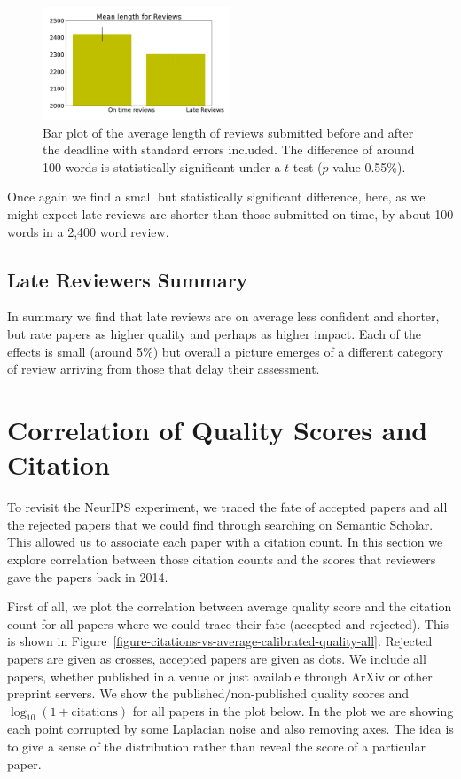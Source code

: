 \begin{figure}[htb]
\centering
\includegraphics[width=0.50\textwidth]{diagrams/neurips/review-length-early-late.pdf}

\caption{Bar plot of the average length of reviews
submitted before and after the deadline with standard errors included.
The difference of around 100 words is statistically significant under a
\(t\)-test (\(p\)-value 0.55\%).} \label{review-length-early-late}
\end{figure}

Once again we find a small but statistically significant difference,
here, as we might expect late reviews are shorter than those submitted
on time, by about 100 words in a 2,400 word review.


\subsection{Late Reviewers Summary}\label{late-reviewers-summary}

In summary we find that late reviews are on average less confident and
shorter, but rate papers as higher quality and perhaps as higher impact.
Each of the effects is small (around 5\%) but overall a picture emerges
of a different category of review arriving from those that delay their
assessment.

\section{Correlation of Quality Scores and
Citation}\label{correlation-of-quality-scores-and-citation}

To revisit the NeurIPS experiment, we traced the fate of accepted papers and all the rejected papers that we could find through searching on Semantic Scholar. This allowed us to associate each paper with a citation count. In this section we explore correlation between those citation counts and the scores that reviewers gave the papers back in 2014.

First of all, we plot the correlation between average quality score and the citation count for all papers where we could trace their fate (accepted and rejected). This is shown in  Figure~\ref{figure-citations-vs-average-calibrated-quality-all}. Rejected papers are given as crosses,
accepted papers are given as dots. We include all papers, whether
published in a venue or just available through ArXiv or other preprint
servers. We show the published/non-published quality scores and
\(\log_{10}(1+\text{citations})\) for all papers in the plot below. In
the plot we are showing each point corrupted by some Laplacian noise and
also removing axes. The idea is to give a sense of the distribution
rather than reveal the score of a particular paper.

